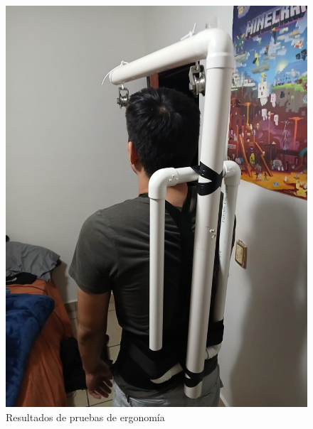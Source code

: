 \begin{figure}[H]
    \centering
    \includegraphics[width=1\textwidth, height=.9\textheight]{img/PruebaErgonomica4.png}
    \caption{Resultados de pruebas de ergonomía}
    \label{fig:ergo-test}
\end{figure}

